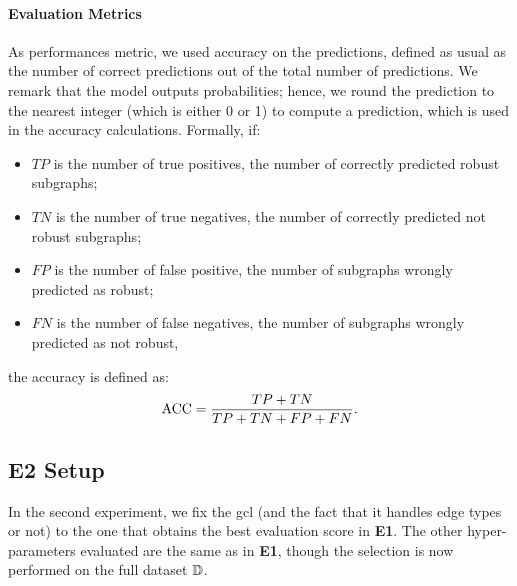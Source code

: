 \paragraph{Evaluation Metrics} As performances metric, we used accuracy on the predictions, defined as usual as the number of correct predictions out of the total number of predictions. We remark that the model outputs probabilities; hence, we round the prediction to the nearest integer (which is either 0 or 1) to compute a  prediction, which is used in the accuracy calculations. Formally, if: \begin{itemize}
    \item $TP$ is the number of true positives, \ie the number of correctly predicted robust subgraphs;
    \item $TN$ is the number of true negatives, \ie the number of correctly predicted not robust subgraphs;
    \item $FP$ is the number of false positive, \ie the number of subgraphs wrongly predicted as robust;
    \item $FN$ is the number of false negatives, \ie the number of subgraphs wrongly predicted as not robust,
\end{itemize}
the accuracy is defined as:
$$ \mathrm{ACC} = \frac{TP + TN}{TP + TN + FP + FN}.$$

\subsection{E2 Setup}
In the second experiment, we fix the \gls{gcl} (and the fact that it handles edge types or not) to the one that obtains the best evaluation score in \textbf{E1}.
The other hyper-parameters evaluated are the same as in \textbf{E1}, though the selection is now performed on the full dataset $\mathbb{D}$.

